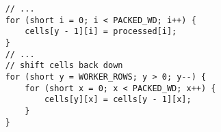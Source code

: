 \begin{minipage}{0.5\textwidth}
    \begin{verbatim}
    // ...
    for (short i = 0; i < PACKED_WD; i++) {
        cells[y - 1][i] = processed[i];
    }
    // ...
    // shift cells back down
    for (short y = WORKER_ROWS; y > 0; y--) {
        for (short x = 0; x < PACKED_WD; x++) {
            cells[y][x] = cells[y - 1][x];
        }
    }
    \end{verbatim}
\end{minipage}